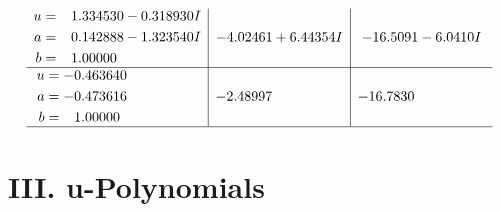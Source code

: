 \documentclass[1p]{elsarticle_modified}
\theoremstyle{definition}
\begin{document}
$$\begin{array}{c|c|c}
\begin{aligned}
u &= \phantom{-}1.334530 - 0.318930 I \\
a &= \phantom{-}0.142888 - 1.323540 I \\
b &= \phantom{-}1.00000\phantom{ +0.000000I}\end{aligned}
 & -4.02461 + 6.44354 I & -16.5091 - 6.0410 I \\ \hline\begin{aligned}
u &= -0.463640\phantom{ +0.000000I} \\
a &= -0.473616\phantom{ +0.000000I} \\
b &= \phantom{-}1.00000\phantom{ +0.000000I}\end{aligned}
 & -2.48997\phantom{ +0.000000I} & -16.7830\phantom{ +0.000000I}\\
 \hline 
 \end{array}$$\newpage
\newpage\renewcommand{\arraystretch}{1}
\centering \section*{ III. u-Polynomials}
\end{document}
